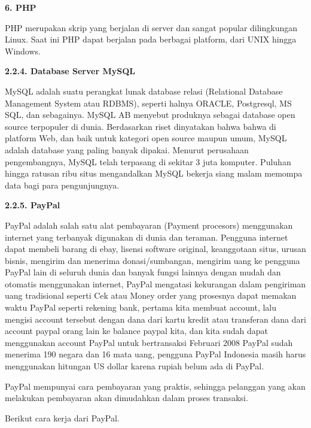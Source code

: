 \documentclass[11pt]{article}
\begin{document}
\textbf{6. PHP}

PHP merupakan skrip yang berjalan di server dan sangat popular dilingkungan Linux. Saat ini PHP dapat berjalan pada berbagai platform, dari UNIX hingga Windows.

\textbf{2.2.4. Database Server MySQL}

MySQL adalah suatu perangkat lunak database relasi (Relational Database Management System atau RDBMS), seperti halnya ORACLE, Postgresql, MS SQL, dan sebagainya. MySQL AB menyebut produknya sebagai database open source terpopuler di dunia. Berdasarkan riset dinyatakan bahwa bahwa di platform Web, dan baik untuk kategori open source maupun umum, MySQL adalah database yang paling banyak dipakai. Menurut perusahaan pengembangnya, MySQL telah terpasang di sekitar 3 juta komputer. Puluhan hingga ratusan ribu situs mengandalkan MySQL bekerja siang malam memompa data bagi para pengunjungnya.

\textbf{2.2.5. PayPal}

PayPal adalah salah satu alat pembayaran (Payment procesors) menggunakan internet yang terbanyak digunakan di dunia dan teraman. Pengguna internet dapat membeli barang di ebay, lisensi software original, keanggotaan situs, urusan bisnis, mengirim dan menerima donasi/sumbangan, mengirim uang ke pengguna PayPal lain di seluruh dunia dan banyak fungsi lainnya dengan mudah dan otomatis menggunakan internet, PayPal mengatasi kekurangan dalam pengiriman uang tradisional seperti Cek atau Money order yang prosesnya dapat memakan waktu PayPal seperti rekening bank, pertama kita membuat account, lalu mengisi account tersebut dengan dana dari kartu kredit atau transferan dana dari account paypal orang lain ke balance paypal kita, dan kita sudah dapat menggunakan account PayPal untuk bertransaksi Februari 2008 PayPal sudah menerima 190 negara dan 16 mata uang, pengguna PayPal Indonesia masih harus menggunakan hitungan US dollar karena rupiah belum ada di PayPal.

PayPal mempunyai cara pembayaran yang praktis, sehingga pelanggan yang akan melakukan pembayaran akan dimudahkan dalam proses transaksi.

\newpage

Berikut cara kerja dari  PayPal.
\end{document}
